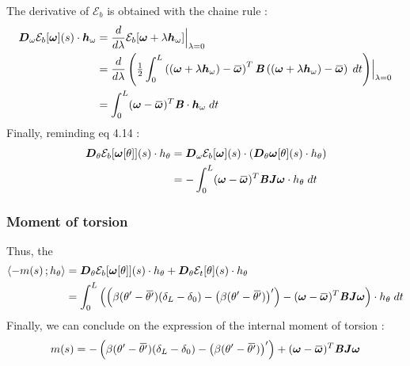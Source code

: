 The derivative of $\mathcal{E}_b$ is obtained with the chaine rule :
\begin{equation}
	\begin{aligned}
	\pdiffof{\omega}{\mathcal{E}_b[\vect{\omega}]}{s}{\vect{h}_\omega}
		&= \frac{d}{d\lambda} \mathcal{E}_b[\vect{\omega} + \lambda \vect{h}_\omega]\Bigr|_{\lambda = 0} \\
		&= \frac{d}{d\lambda}\left( \tfrac{1}{2} \int_{0}^{L} \left((\vect{\omega} + \lambda \vect{h}_\omega)-\overbar{\vect{\omega}}\right)^T \mat{B} \left((\vect{\omega} + \lambda \vect{h}_\omega)-\overbar{\vect{\omega}}\right) \;dt \right)\Bigr|_{\lambda = 0} \\
		&= \int_{0}^{L} (\vect{\omega} - \overbar{\vect{\omega}})^T \mat{B} \cdot \vect{h}_\omega \;dt \\
	\end{aligned}
\end{equation}
Finally, reminding eq 4.14 :
\begin{equation}
	\begin{aligned}
	\pdiffof{\theta}{\mathcal{E}_b[\vect{\omega}[\theta]]}{s}{h_\theta} &=
	\pdiffof{\omega}{\mathcal{E}_b[\vect{\omega}]}{s}{(\pdiffof{\theta}{\vect{\omega}[\theta]}{s}{h_\theta})} \\
	&= - \int_{0}^{L} (\vect{\omega} - \overbar{\vect{\omega}})^T \mat{B} \mat{J}\vect{\omega}\cdot h_\theta \;dt
	\end{aligned}
\end{equation}

\subsubsection{Moment of torsion}
Thus, the 
\begin{equation}
	\begin{aligned}
	\scalar{-m(s)}{h_\theta} &= \pdiffof{\theta}{\mathcal{E}_b[\vect{\omega}[\theta]]}{s}{h_\theta} + \pdiffof{\theta}{\mathcal{E}_t[\theta]}{s}{h_\theta} \\
	&= \int_{0}^{L} \left(\left(\beta(\theta' -{\overbar{\theta'}})(\delta_L-\delta_0) - \left(\beta(\theta' -{\overbar{\theta'}})\right)'\right) - (\vect{\omega} - \overbar{\vect{\omega}})^T \mat{B} \mat{J}\vect{\omega}\right) \cdot h_\theta \;dt
	\end{aligned} 
\end{equation}
Finally, we can conclude on the expression of the internal moment of torsion :
\begin{equation}
	m(s) = - \left(\beta(\theta' -{\overbar{\theta'}})(\delta_L-\delta_0) - \left(\beta(\theta' -{\overbar{\theta'}})\right)'\right) + (\vect{\omega} - \overbar{\vect{\omega}})^T \mat{B} \mat{J}\vect{\omega}
\end{equation}

